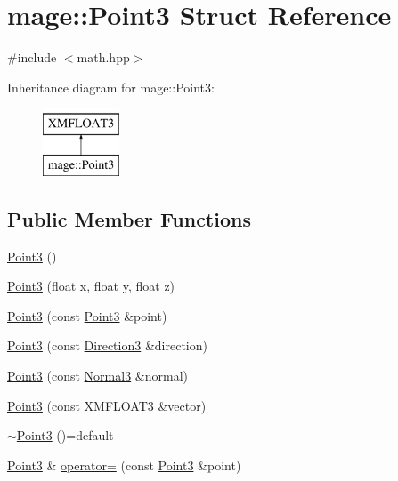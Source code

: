 \hypertarget{structmage_1_1_point3}{}\section{mage\+:\+:Point3 Struct Reference}
\label{structmage_1_1_point3}


{\ttfamily \#include $<$math.\+hpp$>$}

Inheritance diagram for mage\+:\+:Point3\+:\begin{figure}[H]
\begin{center}
\leavevmode
\includegraphics[height=2.000000cm]{structmage_1_1_point3}
\end{center}
\end{figure}
\subsection*{Public Member Functions}
\begin{DoxyCompactItemize}
\item 
\hyperlink{structmage_1_1_point3_a2675c303e54c6047520bc1a298c7fef1}{Point3} ()
\item 
\hyperlink{structmage_1_1_point3_a754210fa30befab6db5957a8d9b397f2}{Point3} (float x, float y, float z)
\item 
\hyperlink{structmage_1_1_point3_ad2e95e6eaa32339663e35f936990eb0c}{Point3} (const \hyperlink{structmage_1_1_point3}{Point3} \&point)
\item 
\hyperlink{structmage_1_1_point3_a5ccb5f2f660b3ecdb471ed859923d4fc}{Point3} (const \hyperlink{structmage_1_1_direction3}{Direction3} \&direction)
\item 
\hyperlink{structmage_1_1_point3_ae56d0fb055b286df68d8d645378408c8}{Point3} (const \hyperlink{structmage_1_1_normal3}{Normal3} \&normal)
\item 
\hyperlink{structmage_1_1_point3_a2298bfe2417508187bdad7fbaa6178c1}{Point3} (const X\+M\+F\+L\+O\+A\+T3 \&vector)
\item 
\hyperlink{structmage_1_1_point3_a952151b6ff72b68569f95445c2ac2495}{$\sim$\+Point3} ()=default
\item 
\hyperlink{structmage_1_1_point3}{Point3} \& \hyperlink{structmage_1_1_point3_a53403b16c67a6c7d72910edaec04e371}{operator=} (const \hyperlink{structmage_1_1_point3}{Point3} \&point)
\end{DoxyCompactItemize}


